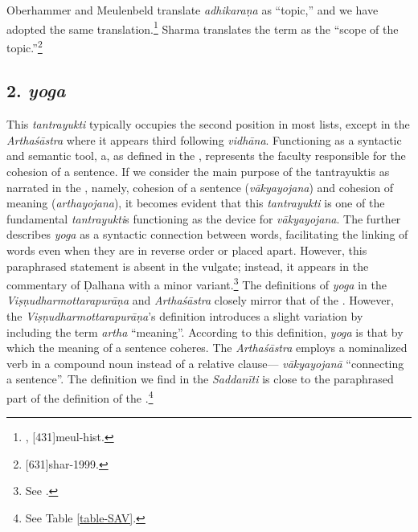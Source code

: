 Oberhammer and Meulenbeld translate \emph{adhikaraṇa} as “topic,” and we have adopted the same translation.\footnote{\cite[601]{ober-1968}, [431]{meul-hist}.} Sharma translates the term as the “scope of the topic.”\footnote{[631]{shar-1999}.}

\subsection{2. \emph{yoga}}

This \emph{tantrayukti} typically occupies the second position in most lists, except in the \emph{Arthaśāstra} where it appears third following \emph{vidhāna}. Functioning as a syntactic and semantic tool, a, as defined in the \SS, represents the faculty responsible for the cohesion of a sentence. If we consider the main purpose of the tantrayuktis as narrated in the \SS, namely, cohesion of a sentence (\emph{vākyayojana}) and cohesion of meaning (\emph{arthayojana}), it becomes evident that this \emph{tantrayukti} is one of the fundamental \emph{tantrayukti}s functioning as the device for \emph{vākyayojana}. The \SS further describes \emph{yoga} as a syntactic connection between words, facilitating the linking of words even when they are in reverse order or placed apart. However, this paraphrased statement is absent in the vulgate; instead, it appears in the commentary of Ḍalhana with a minor variant.\footnote{See .} The definitions of \emph{yoga} in the \emph{Viṣṇudharmottarapurāṇa} and \emph{Arthaśāstra} closely mirror that of the \SS. However, the \emph{Viṣṇudharmottarapurāṇa}'s definition introduces a slight variation by including the term \emph{artha} “meaning”. According to this definition, \emph{yoga} is that by which the meaning of a sentence coheres. The \emph{Arthaśāstra} employs a nominalized verb in a compound noun instead of a relative clause--- \emph{vākyayojanā} “connecting a sentence”. The definition we find in the \emph{Saddanīti} is close to the paraphrased part of the definition of the \SS.\footnote{See Table \ref{table-SAV}.}


